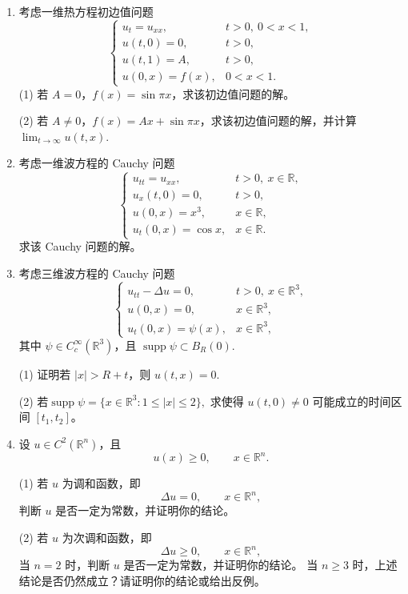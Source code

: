 \begin{enumerate}
\item 考虑一维热方程初边值问题
\[
\begin{cases}
u_t=u_{xx}, & t>0,\ 0<x<1,\\[4pt]
u(t,0)=0, & t>0,\\[4pt]
u(t,1)=A, & t>0,\\[4pt]
u(0,x)=f(x), & 0<x<1.
\end{cases}
\]
(1) 若 $A=0$，$f(x)=\sin \pi x$，求该初边值问题的解。

(2) 若 $A\neq 0$，$f(x)=Ax+\sin \pi x$，求该初边值问题的解，并计算
    $
    \lim_{t\to\infty}u(t,x).
    $

\item 考虑一维波方程的 Cauchy 问题
\[
\begin{cases}
u_{tt}=u_{xx}, & t>0,\ x\in\mathbb{R},\\[4pt]
u_x(t, 0) = 0, & t > 0,\\[4pt]
u(0,x)=x^3, & x\in\mathbb{R},\\[4pt]
u_t(0,x)=\cos x, & x\in\mathbb{R}.
\end{cases}
\]
求该 Cauchy 问题的解。

\item 考虑三维波方程的 Cauchy 问题
\[
\begin{cases}
u_{tt}-\Delta u=0, & t>0,\ x\in\mathbb{R}^3,\\[4pt]
u(0,x)=0, & x\in\mathbb{R}^3,\\[4pt]
u_t(0,x)=\psi(x), & x\in\mathbb{R}^3,
\end{cases}
\]
其中 $\psi\in C_c^\infty(\mathbb{R}^3)$，且
$
\operatorname{supp}\psi\subset B_R(0).
$

(1) 证明若 $|x|>R+t$，则
    $u(t,x)=0.$

(2) 若$\operatorname{supp}\psi=\{x\in\mathbb{R}^3:1\leq |x|\leq 2\},$
    求使得
    $u(t,0)\neq 0$
    可能成立的时间区间 $[t_1,t_2]$。

\item 设 $u\in C^2(\mathbb{R}^n)$，且
\[
u(x)\geq 0,\qquad x\in\mathbb{R}^n.
\]

(1) 若 $u$ 为调和函数，即
    \[
    \Delta u=0,\qquad x\in\mathbb{R}^n,
    \]
    判断 $u$ 是否一定为常数，并证明你的结论。

(2) 若 $u$ 为次调和函数，即
    \[
    \Delta u\geq 0,\qquad x\in\mathbb{R}^n,
    \]
    当 $n=2$ 时，判断 $u$ 是否一定为常数，并证明你的结论。
    当 $n\geq 3$ 时，上述结论是否仍然成立？请证明你的结论或给出反例。

\end{enumerate}
